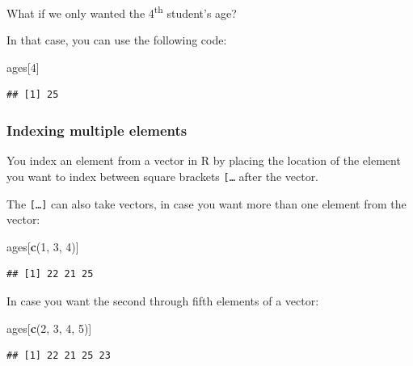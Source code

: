 \documentclass[
]{book}
\newenvironment{Shaded}{\begin{snugshade}}{\end{snugshade}}
\newcommand{\DecValTok}[1]{\textcolor[rgb]{0.00,0.00,0.81}{#1}}
\newcommand{\FunctionTok}[1]{\textcolor[rgb]{0.13,0.29,0.53}{\textbf{#1}}}
\newcommand{\NormalTok}[1]{#1}
\begin{document}
What if we only wanted the 4\textsuperscript{th} student's age?

In that case, you can use the following code:

\begin{Shaded}
\begin{Highlighting}[]
\NormalTok{ages[}\DecValTok{4}\NormalTok{]}
\end{Highlighting}
\end{Shaded}

\begin{verbatim}
## [1] 25
\end{verbatim}

\subsubsection{Indexing multiple elements}\label{indexing-multiple-elements}

You index an element from a vector in R by placing the location of the element you want to index between square brackets \texttt{{[}\textasciigrave{}\textasciigrave{}…\textasciigrave{}\textasciigrave{}{]}} after the vector.

The \texttt{{[}…{]}} can also take vectors, in case you want more than one element from the vector:

\begin{Shaded}
\begin{Highlighting}[]
\NormalTok{ages[}\FunctionTok{c}\NormalTok{(}\DecValTok{1}\NormalTok{, }\DecValTok{3}\NormalTok{, }\DecValTok{4}\NormalTok{)]}
\end{Highlighting}
\end{Shaded}

\begin{verbatim}
## [1] 22 21 25
\end{verbatim}

In case you want the second through fifth elements of a vector:

\begin{Shaded}
\begin{Highlighting}[]
\NormalTok{ages[}\FunctionTok{c}\NormalTok{(}\DecValTok{2}\NormalTok{, }\DecValTok{3}\NormalTok{, }\DecValTok{4}\NormalTok{, }\DecValTok{5}\NormalTok{)]}
\end{Highlighting}
\end{Shaded}

\begin{verbatim}
## [1] 22 21 25 23
\end{verbatim}
\end{document}
